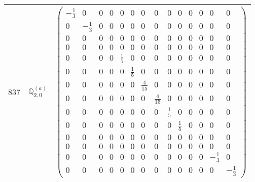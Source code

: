 \documentclass[fleqn,8pt,landscape]{jsarticle}
\begin{document}
\begin{center}
\begin{longtable}{ccc}
$ 837 $ & $ \mathbb{Q}_{2,0}^{(a)} $ & $ \begin{pmatrix} - \frac{1}{3} & 0 & 0 & 0 & 0 & 0 & 0 & 0 & 0 & 0 & 0 & 0 & 0 & 0 \\ 0 & - \frac{1}{3} & 0 & 0 & 0 & 0 & 0 & 0 & 0 & 0 & 0 & 0 & 0 & 0 \\ 0 & 0 & 0 & 0 & 0 & 0 & 0 & 0 & 0 & 0 & 0 & 0 & 0 & 0 \\ 0 & 0 & 0 & 0 & 0 & 0 & 0 & 0 & 0 & 0 & 0 & 0 & 0 & 0 \\ 0 & 0 & 0 & 0 & \frac{1}{5} & 0 & 0 & 0 & 0 & 0 & 0 & 0 & 0 & 0 \\ 0 & 0 & 0 & 0 & 0 & \frac{1}{5} & 0 & 0 & 0 & 0 & 0 & 0 & 0 & 0 \\ 0 & 0 & 0 & 0 & 0 & 0 & \frac{4}{15} & 0 & 0 & 0 & 0 & 0 & 0 & 0 \\ 0 & 0 & 0 & 0 & 0 & 0 & 0 & \frac{4}{15} & 0 & 0 & 0 & 0 & 0 & 0 \\ 0 & 0 & 0 & 0 & 0 & 0 & 0 & 0 & \frac{1}{5} & 0 & 0 & 0 & 0 & 0 \\ 0 & 0 & 0 & 0 & 0 & 0 & 0 & 0 & 0 & \frac{1}{5} & 0 & 0 & 0 & 0 \\ 0 & 0 & 0 & 0 & 0 & 0 & 0 & 0 & 0 & 0 & 0 & 0 & 0 & 0 \\ 0 & 0 & 0 & 0 & 0 & 0 & 0 & 0 & 0 & 0 & 0 & 0 & 0 & 0 \\ 0 & 0 & 0 & 0 & 0 & 0 & 0 & 0 & 0 & 0 & 0 & 0 & - \frac{1}{3} & 0 \\ 0 & 0 & 0 & 0 & 0 & 0 & 0 & 0 & 0 & 0 & 0 & 0 & 0 & - \frac{1}{3} \end{pmatrix} $ \\ \hline

\end{longtable}
\end{center}
\end{document}

